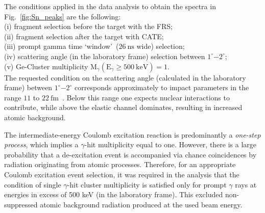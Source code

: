 \documentclass[prc,twocolumn,amssymb,amsmath,showpacs,superscriptaddress]{revtex4}
\begin{document}
The conditions applied in the data analysis to obtain the spectra
in Fig.~\ref{fig:Sn_peaks} are the following:\\
(i) fragment selection before the target with the FRS;\\
(ii)
fragment selection after the target with CATE;\\
(iii) prompt gamma
time \textquoteleft window\textquoteright\ ($26\ \text{ns}$ wide)
selection;\\
(iv) scattering angle (in the laboratory frame)
selection between $1^{\circ}$$-$$2^{\circ}$;\\
(v) Ge-Cluster
multiplicity $\text{M}_{\gamma}(\text{E}_{\gamma} \geq 500\
\text{keV}) = 1$.\\
The requested condition on the scattering angle (calculated in the
laboratory frame) between $1^{\circ}$$-$$2^{\circ}$
corresponds approximately to impact parameters in the range $11$
to $22\ \text{fm}$~\cite{ban05}. Below this range one expects
nuclear interactions to contribute,
while above the elastic channel dominates, resulting in increased
atomic background.

The intermediate-energy Coulomb excitation reaction is
predominantly a \textit{one-step process}, which implies a
$\gamma$-hit multiplicity equal to one. However, there is a large
probability that a de-excitation event is accompanied via chance
coincidences by radiation originating from atomic processes.
Therefore, for an appropriate Coulomb excitation event selection,
it was required in the analysis that the condition of single
$\gamma$-hit cluster multiplicity is satisfied only for prompt
$\gamma$ rays at energies in excess of 500 keV (in the laboratory
frame). This excluded non-suppressed atomic background radiation
produced at the used beam energy.
\end{document}
